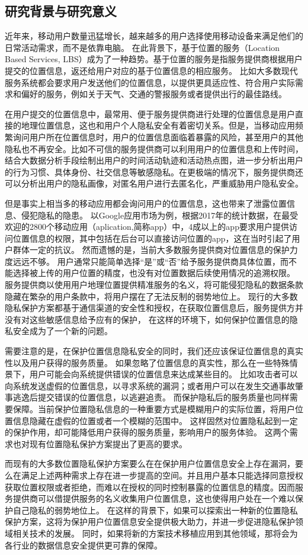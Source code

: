 \documentclass[zihao=-4]{ctexart}
\begin{document}
\subsection{研究背景与研究意义}
近年来，移动用户数量迅猛增长，越来越多的用户选择使用移动设备来满足他们的日常活动需求，而不是依靠电脑。
\cite{czh_1.1}在此背景下，基于位置的服务（Location Based Services, LBS）成为了一种趋势。基于位置的服务是指服务提供商根据用户提交的位置信息，返还给用户对应的基于位置信息的相应服务。
比如大多数现代服务系统都会要求用户发送他们的位置信息，以提供更具适应性、符合用户实际需求和偏好的服务，例如关于天气、交通的警报服务或者提供出行的最佳路线。\cite{czh_1.2}
\par
在用户提交的位置信息中，最常用、便于服务提供商进行处理的位置信息是用户直接的地理位置信息，这也和用户个人隐私安全有着密切关系。但是，当移动应用频繁询问用户所在位置信息时，用户的位置信息面临着暴露的风险，甚至用户的其他隐私也不再安全。比如不可信的服务提供商可以利用用户的位置信息和上传时间，结合大数据分析手段绘制出用户的时间活动轨迹和活动热点图，进一步分析出用户的行为习惯、具体身份、社交信息等敏感隐私。在更极端的情况下，服务提供商还可以分析出用户的隐私画像，对匿名用户进行去匿名化，严重威胁用户隐私安全。
\par
但是事实上相当多的移动应用都会询问用户的位置信息，这也带来了泄露位置信息、侵犯隐私的隐患。
以Google应用市场为例，根据2017年的统计数据，在最受欢迎的2800个移动应用（aplication,简称app）中，4成以上的app要求用户提供访问位置信息的权限，其中包括在后台可以直接访问位置的app，\cite{czh_1.3}这在当时引起了用户群体一定的抗议。
然而遗憾的是，当前大多数服务提供商对位置信息的保护力度远远不够。
用户通常只能简单选择“是”或“否”给予服务提供商具体位置，而不能选择被上传的用户位置的精度，也没有对位置数据后续使用情况的追溯权限。
服务提供商以使用用户地理位置提供精准服务的名义，将可能侵犯隐私的数据条款隐藏在繁杂的用户条款中，将用户摆在了无法反制的弱势地位上。
现行的大多数隐私保护方案都基于通信渠道的安全性和授权，在获取位置信息后，服务提供方并没有对这些敏感信息给予应有的保护，
\cite{czh_1.4}在这样的环境下，如何保护位置信息的隐私安全成为了一个新的问题。
\par
需要注意的是，在保护位置信息隐私安全的同时，我们还应该保证位置信息的真实性以及用户获得的服务质量。
如果忽略了位置信息的真实性，那么在一些特殊情景下，用户可能会向系统提供错误的位置信息来达成某些目的。
比如攻击者可以向系统发送虚假的位置信息，以寻求系统的漏洞；或者用户可以在发生交通事故肇事逃逸后提交错误的位置信息，以逃避追责\cite{czh_1.5}。
而保护隐私后的服务质量也同样需要保障。当前保护位置隐私信息的一种重要方式是模糊用户的实际位置，将用户位置信息隐藏在虚假的位置或者一个模糊的范围中。
这样固然对位置隐私起到一定的保护作用，却可能降低用户获得的服务质量，影响用户的服务体验。
这两个需求也对现有位置隐私保护方案提出了更高的要求。
\par
而现有的大多数位置隐私保护方案要么在在保护用户位置信息安全上存在漏洞，要么在满足上述两种需求上存在进一步提高的空间。并且用户基本只能选择同意授权获取位置权限或者拒绝，而难以在授权的同时控制暴露的位置信息的精度。因而服务提供商可以借提供服务的名义收集用户位置信息，这也使得用户处在一个难以保护自己隐私的弱势地位上。
在这样的背景下，如果可以探索出一种新的位置隐私保护方案，这将为保护用户位置信息安全提供极大助力，并进一步促进隐私保护领域相关技术的发展。
同时，如果将新的方案技术移植应用到其他领域，那将会为各行业的数据信息安全提供更可靠的保障。
\end{document}
